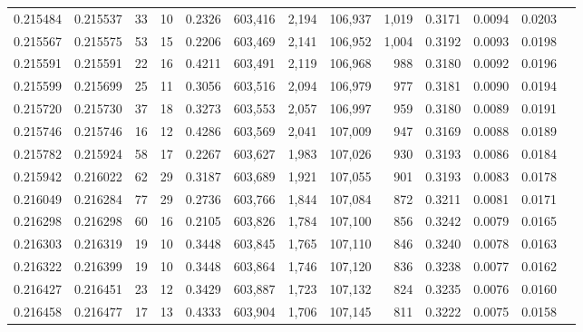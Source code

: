 \begin{tabular}{rrrrrrrrrrrrr}
0.215484 & 0.215537 &    33 &  10 &                                     0.2326 & 603,416 &   2,194 & 106,937 &   1,019 & 0.3171 & 0.0094 & 0.0203 \\
0.215567 & 0.215575 &    53 &  15 &                                     0.2206 & 603,469 &   2,141 & 106,952 &   1,004 & 0.3192 & 0.0093 & 0.0198 \\
0.215591 & 0.215591 &    22 &  16 &                                     0.4211 & 603,491 &   2,119 & 106,968 &     988 & 0.3180 & 0.0092 & 0.0196 \\
0.215599 & 0.215699 &    25 &  11 &                                     0.3056 & 603,516 &   2,094 & 106,979 &     977 & 0.3181 & 0.0090 & 0.0194 \\
0.215720 & 0.215730 &    37 &  18 &                                     0.3273 & 603,553 &   2,057 & 106,997 &     959 & 0.3180 & 0.0089 & 0.0191 \\
0.215746 & 0.215746 &    16 &  12 &                                     0.4286 & 603,569 &   2,041 & 107,009 &     947 & 0.3169 & 0.0088 & 0.0189 \\
0.215782 & 0.215924 &    58 &  17 &                                     0.2267 & 603,627 &   1,983 & 107,026 &     930 & 0.3193 & 0.0086 & 0.0184 \\
0.215942 & 0.216022 &    62 &  29 &                                     0.3187 & 603,689 &   1,921 & 107,055 &     901 & 0.3193 & 0.0083 & 0.0178 \\
0.216049 & 0.216284 &    77 &  29 &                                     0.2736 & 603,766 &   1,844 & 107,084 &     872 & 0.3211 & 0.0081 & 0.0171 \\
0.216298 & 0.216298 &    60 &  16 &                                     0.2105 & 603,826 &   1,784 & 107,100 &     856 & 0.3242 & 0.0079 & 0.0165 \\
0.216303 & 0.216319 &    19 &  10 &                                     0.3448 & 603,845 &   1,765 & 107,110 &     846 & 0.3240 & 0.0078 & 0.0163 \\
0.216322 & 0.216399 &    19 &  10 &                                     0.3448 & 603,864 &   1,746 & 107,120 &     836 & 0.3238 & 0.0077 & 0.0162 \\
0.216427 & 0.216451 &    23 &  12 &                                     0.3429 & 603,887 &   1,723 & 107,132 &     824 & 0.3235 & 0.0076 & 0.0160 \\
0.216458 & 0.216477 &    17 &  13 &                                     0.4333 & 603,904 &   1,706 & 107,145 &     811 & 0.3222 & 0.0075 & 0.0158 \\

\end{tabular}
